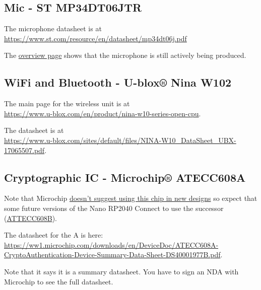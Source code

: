 \subsection{Mic - ST MP34DT06JTR}
The microphone datasheet is at \\
\href{https://www.st.com/resource/en/datasheet/mp34dt06j.pdf}{https://www.st.com/resource/en/datasheet/mp34dt06j.pdf}

The \href{https://www.st.com/en/mems-and-sensors/mp34dt06j.html#sample-buy}{overview page} shows that the microphone is still actively being produced.

\subsection{WiFi and Bluetooth - U-blox® Nina W102}
The main page for the wireless unit is at \\
\href{https://www.u-blox.com/en/product/nina-w10-series-open-cpu}{https://www.u-blox.com/en/product/nina-w10-series-open-cpu}.

The datasheet is at \\
\href{https://www.u-blox.com/sites/default/files/NINA-W10\_DataSheet\_UBX-17065507.pdf}{https://www.u-blox.com/sites/default/files/NINA-W10\_DataSheet\_UBX-17065507.pdf}.

\subsection{Cryptographic IC - Microchip® ATECC608A}
Note that Microchip \href{https://www.microchip.com/en-us/product/ATECC608A}{doesn't suggest using this chip in new designs} so expect that some future versions of the
Nano RP2040 Connect to use the successor (\href{https://www.microchip.com/en-us/product/ATECC608B}{ATTECC608B}).

The datasheet for the A is here: \\
\href{https://ww1.microchip.com/downloads/en/DeviceDoc/ATECC608A-CryptoAuthentication-Device-Summary-Data-Sheet-DS40001977B.pdf}{https://ww1.microchip.com/downloads/en/DeviceDoc/ATECC608A-CryptoAuthentication-Device-Summary-Data-Sheet-DS40001977B.pdf}.

Note that it says it is a summary datasheet. You have to sign an NDA with Microchip to see the full datasheet.

